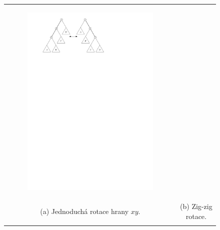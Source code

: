 \begin{figure}[h!]
\begin{tabular}{cc}
\begin{subfigure}{0.45\textwidth}
  \centering
  \includegraphics[width=.99\linewidth]{../img/zigzig_rotation}
\end{subfigure}\\

\noalign{\bigskip}
(a) Jednoduchá rotace hrany $xy$. 
&
(b) Zig-zig rotace.\\
\noalign{\bigskip}


\end{tabular}
\end{figure}
